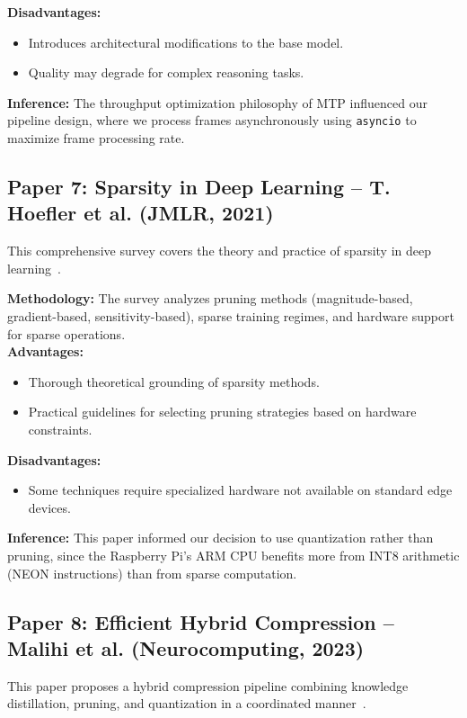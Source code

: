 \documentclass[11pt]{report}
\begin{document}
\textbf{Disadvantages:}
\begin{itemize}
    \item Introduces architectural modifications to the base model.
    \item Quality may degrade for complex reasoning tasks.
\end{itemize}

\textbf{Inference:}
The throughput optimization philosophy of MTP influenced our pipeline design, where we process frames asynchronously using \texttt{asyncio} to maximize frame processing rate.

\subsection{Paper 7: Sparsity in Deep Learning -- T. Hoefler et al. (JMLR, 2021)}
This comprehensive survey covers the theory and practice of sparsity in deep learning~\cite{hoefler2021}. \par

\textbf{Methodology:} The survey analyzes pruning methods (magnitude-based, gradient-based, sensitivity-based), sparse training regimes, and hardware support for sparse operations. \\

\textbf{Advantages:}
\begin{itemize}
    \item Thorough theoretical grounding of sparsity methods.
    \item Practical guidelines for selecting pruning strategies based on hardware constraints.
\end{itemize}

\textbf{Disadvantages:}
\begin{itemize}
    \item Some techniques require specialized hardware not available on standard edge devices.
\end{itemize}

\textbf{Inference:}
This paper informed our decision to use quantization rather than pruning, since the Raspberry Pi's ARM CPU benefits more from INT8 arithmetic (NEON instructions) than from sparse computation.

\subsection{Paper 8: Efficient Hybrid Compression -- Malihi et al. (Neurocomputing, 2023)}
This paper proposes a hybrid compression pipeline combining knowledge distillation, pruning, and quantization in a coordinated manner~\cite{malihi2023}. \par
\end{document}
